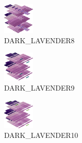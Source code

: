 \hspace{0.1cm}
\begin{minipage}[b]{0.15\linewidth}
\begin{figure}[H]                                                          
  \centering                                                             
  \begin{adjustbox}{width=1.5cm,center}                                   
  \includegraphics[width=1.5cm]{src/colorspace_colourflow/flows/colourflow_88-45.png}%
  \end{adjustbox}                                                        
\caption*{DARK\_LAVENDER8}                                           
\end{figure}                                                               
\end{minipage}
\hspace{0.1cm}
\begin{minipage}[b]{0.15\linewidth}
\begin{figure}[H]                                                          
  \centering                                                             
  \begin{adjustbox}{width=1.5cm,center}                                   
  \includegraphics[width=1.5cm]{src/colorspace_colourflow/flows/colourflow_89-45.png}%
  \end{adjustbox}                                                        
\caption*{DARK\_LAVENDER9}                                           
\end{figure}                                                               
\end{minipage}
\hspace{0.1cm}
\begin{minipage}[b]{0.15\linewidth}
\begin{figure}[H]                                                          
  \centering                                                             
  \begin{adjustbox}{width=1.5cm,center}                                   
  \includegraphics[width=1.5cm]{src/colorspace_colourflow/flows/colourflow_90-45.png}%
  \end{adjustbox}                                                        
\caption*{DARK\_LAVENDER10}                                           
\end{figure}                                                               
\end{minipage}
